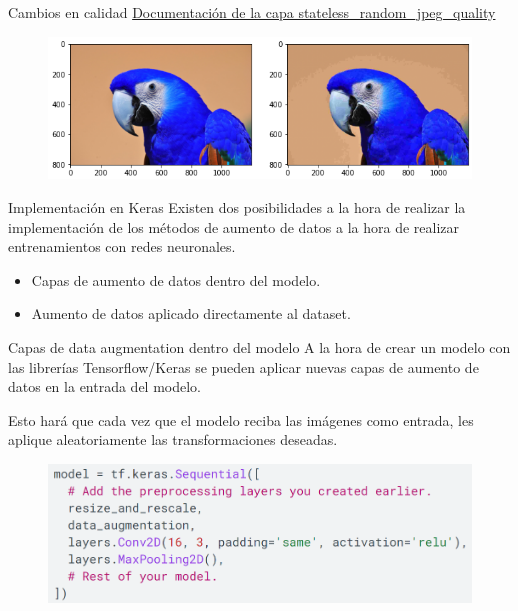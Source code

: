 \begin{frame}{Cambios en calidad}
\textcolor{blue}{\href{https://www.tensorflow.org/api_docs/python/tf/image/stateless_random_jpeg_quality}{Documentación de la capa stateless\_random\_jpeg\_quality}}
\begin{figure}
    \centering
    \includegraphics[width=\textwidth]{Slides/figures/Tema 3/Quality.png}
\end{figure}
\end{frame}

\begin{frame}{Implementación en Keras}
Existen dos posibilidades a la hora de realizar la implementación de los métodos de aumento de datos a la hora de realizar \alert{entrenamientos} con redes neuronales.

\begin{itemize}
    \item Capas de aumento de datos \alert{dentro del modelo}.
    \item Aumento de datos aplicado directamente al \alert{dataset}.
\end{itemize}
\end{frame}

\begin{frame}{Capas de data augmentation dentro del modelo}
A la hora de crear un modelo con las librerías \alert{Tensorflow/Keras} se pueden aplicar nuevas capas de aumento de datos en la \alert{entrada} del modelo.

Esto hará que cada vez que el modelo \alert{reciba las imágenes} como entrada, les aplique aleatoriamente las \alert{transformaciones} deseadas.

\begin{figure}
    \centering
    \includegraphics[width=\textwidth]{Slides/figures/Tema 3/DAKeras_1.png}
\end{figure}
\end{frame}

